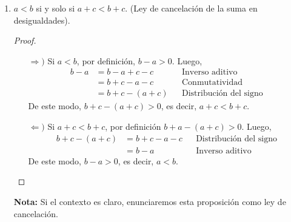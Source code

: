 \documentclass[11pt]{article}
\begin{document}
\begin{enumerate}[label=\alph*)]
    \item $a<b$ si y solo si $a+c<b+c$. (Ley de cancelación de la suma en desigualdades).
    
    \vspace{-1em}\begin{proof} \leavevmode
    \begin{itemize}
        \item[$\Rightarrow)$] Si $a<b$, por definición, $b-a >0$. Luego, \begin{align*}
            b - a%
            &= b-a+c-c && \text{Inverso aditivo}\\
            &= b+c-a-c && \text{Conmutatividad}\\
            &= b+c-(a+c) && \text{Distribución del signo}
            \end{align*} De este modo, $b+c-(a+c)>0$, es decir, $a+c<b+c$.
        \item[$\Leftarrow)$] Si $a+c<b+c$, por definición $b+a-(a+c)>0$. Luego, \begin{align*}
            b+c-(a+c) &= b+c-a-c && \text{Distribución del signo}\\
            &= b-a && \text{Inverso aditivo}
        \end{align*} De este modo, $b-a>0$, es decir, $a<b$. \qedhere
        \end{itemize}    
    \end{proof} \vspace{-1em}

    \textbf{Nota:} Si el contexto es claro, enunciaremos esta proposición como ley de cancelación.


\end{enumerate}
\end{document}
